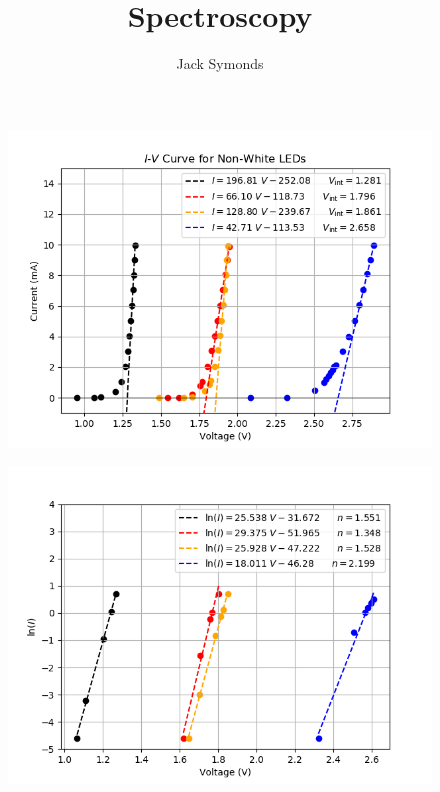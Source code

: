 \documentclass[8pt, a4paper]{article}
\title{Spectroscopy}
\author{Jack Symonds}
\date{}
\begin{document}
\begin{figure}[h]
\includegraphics{linear_IV.png}
\end{figure}

\begin{figure}[h]
\includegraphics{log_IV.png}
\end{figure}


\end{document}

